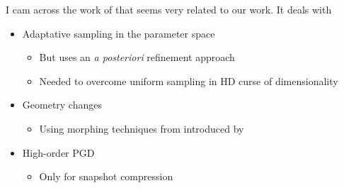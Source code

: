 I cam across the work of \cite{lu_adaptive_2018} that seems very related to our work. It deals with 
\begin{itemize}
	\item Adaptative sampling in the parameter space
	\begin{itemize}
		\item But uses an \emph{a posteriori} refinement approach
		\item Needed to overcome uniform sampling in HD curse of dimensionality 
	\end{itemize}
	\item Geometry changes
	\begin{itemize}
		\item Using morphing techniques from introduced by \cite{galland_global_2011}
	\end{itemize}
	\item High-order PGD
	\begin{itemize}
		\item Only for snapshot compression
	\end{itemize}
\end{itemize}
